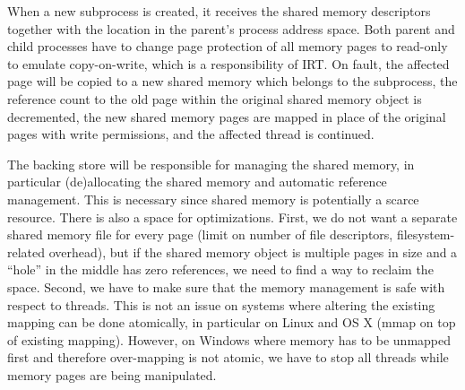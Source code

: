 When a new subprocess is created, it receives the shared memory
descriptors together with the location in the parent's process address
space. Both parent and child processes have to change page protection of
all memory pages to read-only to emulate copy-on-write, which is a
responsibility of IRT. On fault, the affected page will be copied to a
new shared memory which belongs to the subprocess, the reference count
to the old page within the original shared memory object is decremented,
the new shared memory pages are mapped in place of the original pages
with write permissions, and the affected thread is continued.

The backing store will be responsible for managing the shared memory,
in particular (de)allocating the shared memory and automatic reference
management. This is necessary since shared memory is potentially a
scarce resource. There is also a space for optimizations. First, we do
not want a separate shared memory file for every page (\eg limit on
number of file descriptors, filesystem-related overhead), but if the
shared memory object is multiple pages in size and a ``hole'' in the
middle has zero references, we need to find a way to reclaim the space.
Second, we have to make sure that the memory management is safe with
respect to threads. This is not an issue on systems where altering the
existing mapping can be done atomically, in particular on Linux and OS X
(\ie mmap on top of existing mapping).  However, on Windows where memory
has to be unmapped first and therefore over-mapping is not atomic, we
have to stop all threads while memory pages are being manipulated.


